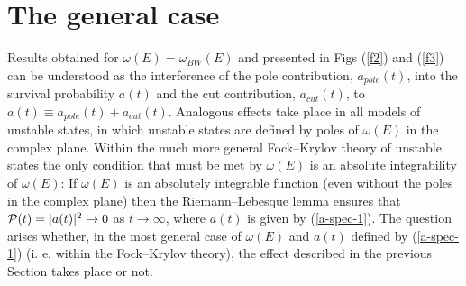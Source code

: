 \documentclass[12pt]{article}
\begin{document}
\section{The general case}
Results obtained for $\omega (E) = \omega_{BW}(E)$ and presented in Figs (\ref{f2}) and (\ref{f3}) can be understood as the interference of the pole contribution, $a_{pole}(t)$, into the survival probability $a(t)$ and the cut contribution, $a_{cut}(t)$, to $a(t) \equiv  a_{pole}(t) + a_{cut}(t)$. Analogous effects take place in all models of unstable states, in which unstable states are defined by poles of $\omega (E)$ in the complex plane.
Within the much more general Fock--Krylov theory \cite{fock} of unstable states the only condition that must be met by $\omega (E)$ is an absolute integrability of $\omega (E)$: If
$\omega (E)$ is an absolutely integrable function (even without the poles in the complex plane) then the Riemann--Lebesque lemma ensures that ${\cal P}(t) = |a(t)|^{2} \to 0$ as $t \to \infty$, where $a (t)$ is given by  (\ref{a-spec-1}). The question arises whether, in the most general case of $\omega (E)$ and $a(t)$ defined by  (\ref{a-spec-1}) (i. e. within the Fock--Krylov theory),
the effect described in the previous Section takes place or not.
\end{document}
